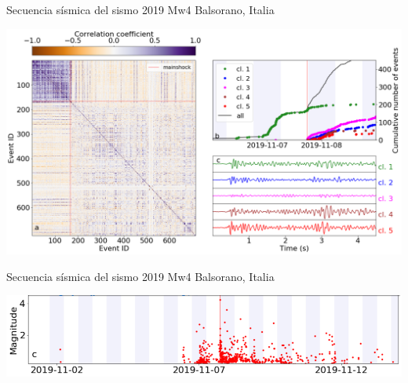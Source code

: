 \documentclass{beamer}
\begin{document}
\begin{frame}
 {Secuencia s\'ismica del sismo 2019 Mw4 Balsorano, Italia}

 \begin{minipage}{1\linewidth}
  \centering \includegraphics[width=1\linewidth]{images/wigg_cc_mat_cluster.png}
 \end{minipage} 
 
\end{frame}

\begin{frame}
 {Secuencia s\'ismica del sismo 2019 Mw4 Balsorano, Italia}

   \includegraphics[width=1\linewidth]{images/magnitudes.png}
 
\end{frame}
\end{document}
